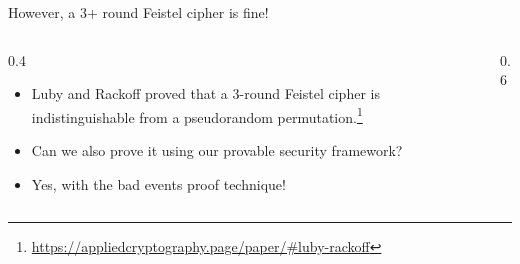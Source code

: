 \ifdefined\PRESENTATION\else\PassOptionsToClass{handout}{beamer}\fi\documentclass[aspectratio=169, lualatex]{beamer}
\begin{document}
	\begin{frame}{However, a 3+ round Feistel cipher is fine!}
		\begin{columns}[c]
			\begin{column}{0.4\textwidth}
				\begin{itemize}
					\item Luby and Rackoff proved that a 3-round Feistel cipher is indistinguishable from a pseudorandom permutation.\footnote{\url{https://appliedcryptography.page/paper/\#luby-rackoff}}
					\item Can we also prove it using our provable security framework?
					\item Yes, with the bad events proof technique!
				\end{itemize}
			\end{column}
			\begin{column}{0.6\textwidth}
				\begin{center}
				\end{center}
			\end{column}
		\end{columns}
	\end{frame}
\end{document}
